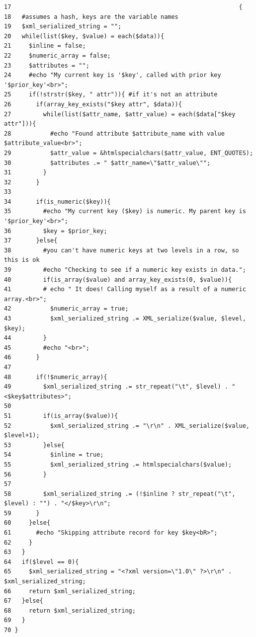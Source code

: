 \begin{Code}\begin{verbatim}17                                                                {
18   #assumes a hash, keys are the variable names
19   $xml_serialized_string = "";
20   while(list($key, $value) = each($data)){
21     $inline = false;
22     $numeric_array = false;
23     $attributes = "";
24     #echo "My current key is '$key', called with prior key '$prior_key'<br>";
25     if(!strstr($key, " attr")){ #if it's not an attribute
26       if(array_key_exists("$key attr", $data)){
27         while(list($attr_name, $attr_value) = each($data["$key attr"])){
28           #echo "Found attribute $attribute_name with value $attribute_value<br>";
29           $attr_value = &htmlspecialchars($attr_value, ENT_QUOTES);
30           $attributes .= " $attr_name=\"$attr_value\"";
31         }
32       }
33 
34       if(is_numeric($key)){
35         #echo "My current key ($key) is numeric. My parent key is '$prior_key'<br>";
36         $key = $prior_key;
37       }else{
38         #you can't have numeric keys at two levels in a row, so this is ok
39         #echo "Checking to see if a numeric key exists in data.";
40         if(is_array($value) and array_key_exists(0, $value)){
41         # echo " It does! Calling myself as a result of a numeric array.<br>";
42           $numeric_array = true;
43           $xml_serialized_string .= XML_serialize($value, $level, $key);
44         }
45         #echo "<br>";
46       }
47 
48       if(!$numeric_array){
49         $xml_serialized_string .= str_repeat("\t", $level) . "<$key$attributes>";
50 
51         if(is_array($value)){
52           $xml_serialized_string .= "\r\n" . XML_serialize($value, $level+1);
53         }else{
54           $inline = true;
55           $xml_serialized_string .= htmlspecialchars($value);
56         }
57 
58         $xml_serialized_string .= (!$inline ? str_repeat("\t", $level) : "") . "</$key>\r\n";
59       }
60     }else{
61       #echo "Skipping attribute record for key $key<bR>";
62     }
63   }
64   if($level == 0){
65     $xml_serialized_string = "<?xml version=\"1.0\" ?>\r\n" . $xml_serialized_string;
66     return $xml_serialized_string;
67   }else{
68     return $xml_serialized_string;
69   }
70 }
\end{verbatim}
\end{Code}




